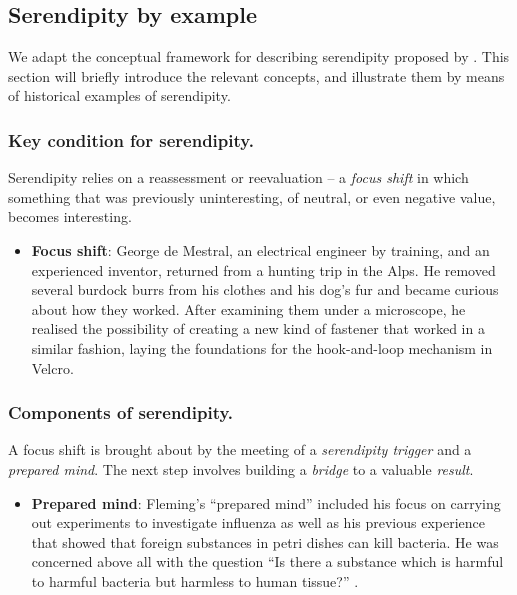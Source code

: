 \subsection{Serendipity by example} \label{sec:by-example}

We adapt the conceptual framework for describing serendipity proposed
by .  This section will briefly introduce
the relevant concepts, and illustrate them by means of historical
examples of serendipity.

\subsubsection*{Key condition for serendipity.}

Serendipity relies on a reassessment or reevaluation -- a \emph{focus shift} in which something that was previously uninteresting, of neutral, or even negative value, becomes interesting.

\begin{itemize}
\item \textbf{Focus shift}: George de Mestral, an electrical engineer
  by training, and an experienced inventor, returned from a hunting
  trip in the Alps.  He removed several burdock burrs from his clothes
  and his dog's fur and became curious about how they worked. After
  examining them under a microscope, he realised the possibility of
  creating a new kind of fastener that worked in a similar fashion,
  laying the foundations for the hook-and-loop mechanism in Velcro\texttrademark.
\end{itemize}

\subsubsection*{Components of serendipity.}

A focus shift is brought about by the meeting of a \emph{serendipity trigger} and a \emph{prepared mind}.  The next step involves building a \emph{bridge} to a valuable \emph{result}.

\begin{itemize}
\item \textbf{Prepared mind}: 
Fleming's ``prepared mind'' included his focus
on carrying out experiments to investigate influenza as well as his
previous experience that showed that foreign substances in petri dishes can kill
bacteria.  He was concerned above all with the question ``Is there a
substance which is harmful to harmful bacteria but harmless to human
tissue?''  \cite[p. 161]{roberts}.
\end{itemize}

